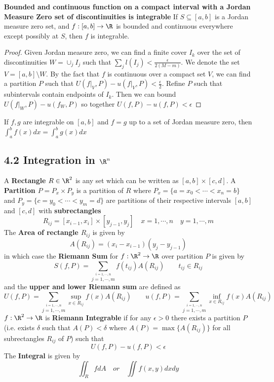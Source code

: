 \documentclass[11pt]{article}
\begin{document}
\begin{theorem*}
  \textbf{Bounded and continuous function on a compact interval with a Jordan Measure Zero set of discontinuities is integrable} If $S\subseteq [a,b]$ is a Jordan measure zero set, and $f: [a,b]\to \R$ is bounded and continuous everywhere except possibly at $S$, then $f$ is integrable.
  \begin{proof}
    Given Jordan measure zero, we can find a finite cover $I_k$ over the set of discontinuities $W = \cup_j I_j$ such that $\sum_j l(I_j) < \frac{\epsilon}{2(M-m)}$. We denote the set $V = [a,b] \setminus W$. By the fact that $f$ is continuous over a compact set $V$, we can find a partition $P$ such that $U(f|_V, P) - u(f|_V, P) < \frac{\epsilon}{2}$. Refine $P$ such that subintervals contain endpoints of $I_k$. Then we can bound $U(f|_W, P) - u(f_W, P)$ so together $U(f,P) - u(f,P) < \epsilon$
  \end{proof}
\end{theorem*}

\begin{corollary*}
  If $f,g$ are integrable on $[a,b]$ and $f=g$ up to a set of Jordan measure zero, then $\int_a^b f(x)dx = \int_a^b g(x)dx$
\end{corollary*}



\subsection*{4.2 Integration in $\R^n$}

\begin{defn*}
  $ $\\
  A \textbf{Rectangle $R\in\R^2$} is any set which can be written as $[a,b]\times[c,d]$. A \textbf{Partition $P = P_x \times P_y$} is a partition of $R$ where $P_x = \{ a = x_0 < \cdots < x_n = b\}$ and $P_y = \{ c = y_0 < \cdots < y_m = d\}$ are partitions of their respective intervals $[a,b]$ and $[c,d]$ with \textbf{subrectangles}
  \[
    R_{ij} = [x_{i-1}, x_i]\times[y_{j-1}, y_j] \quad x = 1,\cdots, n\quad y = 1,\cdots, m
  \]
  The \textbf{Area of rectangle $R_{ij}$} is given by
  \[
    A(R_{ij}) = (x_i - x_{i-1})(y_j - y_{j-1})
  \]
  in which case the \textbf{Riemann Sum} for $f:\R^2 \to \R$ over partition $P$ is given by
  \[
    S(f,P) = \sum_{\overset{i=1,\cdots, n}{j=1,\cdots, m}} f(t_{ij}) A(R_{ij}) \quad \quad t_{ij}\in R_{ij}
  \]
  and the \textbf{upper and lower Riemann sum} are defined as
  \[
    U(f,P) = \sum_{\overset{i=1,\cdots, n}{j=1,\cdots, m}} \underset{x\in R_{ij}}{\sup}f(x) A(R_{ij}) \quad\quad
    u(f,P) = \sum_{\overset{i=1,\cdots, n}{j=1,\cdots, m}} \underset{x\in R_{ij}}{\inf}f(x) A(R_{ij})
  \]
  $f:\R^2\to\R$ is \textbf{Riemann Integrable} if for any $\epsilon > 0$ there exists a partition $P$ (i.e. exists $\delta$ such that $A(P) < \delta$ where $A(P) = \max\{ A(R_{ij})\}$ for all subrectangles $R_{ij}$ of $P$) such that
  \[
    U(f,P) - u(f,P) < \epsilon
  \]
  The \textbf{Integral} is given by
  \[
    \iint_{R} f dA \quad or \quad \iint f(x,y)dxdy
  \]
\end{defn*}
\end{document}
